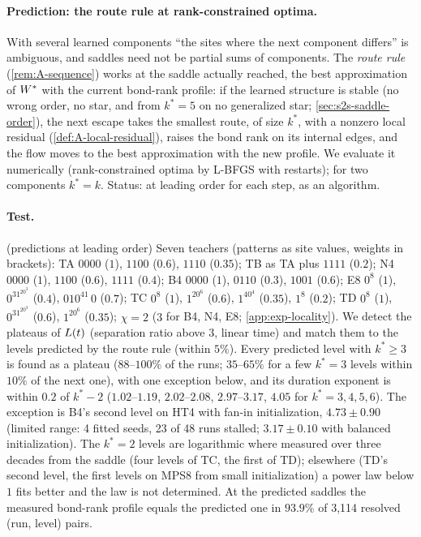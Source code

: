 \paragraph{Prediction: the route rule at rank-constrained optima.}
With several learned components ``the sites where the next component differs'' is ambiguous, and saddles need not
be partial sums of components. The \emph{route rule} (\cref{rem:A-sequence}) works at the saddle actually
reached, the best approximation of $W^{*}$ with the current bond-rank profile: if the learned structure is stable
(no wrong order, no star, and from $k^*=5$ on no generalized star; \cref{sec:s2s-saddle-order}), the next escape
takes the smallest route, of size $k^*$, with a nonzero local residual (\cref{def:A-local-residual}), raises the
bond rank on its internal edges, and the flow moves to the best approximation with the new profile. We evaluate
it numerically (rank-constrained optima by L-BFGS with restarts); for two components $k^*=k$. Status: \derived{}
at leading order for each step, \conjecture{} as an algorithm.

\paragraph{Test.}
\empirical{} (predictions \derived{} at leading order) Seven teachers (patterns as site values, weights in
brackets): TA $0000$ ($1$), $1100$ ($0.6$), $1110$ ($0.35$); TB as TA plus $1111$ ($0.2$); N4 $0000$ ($1$),
$1100$ ($0.6$), $1111$ ($0.4$); B4 $0000$ ($1$), $0110$ ($0.3$), $1001$ ($0.6$); E8 $0^8$ ($1$), $0^31^20^3$
($0.4$), $010^41\,0$ ($0.7$); TC $0^8$ ($1$), $1^20^6$ ($0.6$), $1^40^4$ ($0.35$), $1^8$ ($0.2$); TD $0^8$ ($1$),
$0^31^20^3$ ($0.6$), $1^20^6$ ($0.35$); $\chi=2$ ($3$ for B4, N4, E8; \cref{app:exp-locality}). We detect the
plateaus of $L(t)$ (separation ratio above $3$, linear time) and match them to the levels predicted by the
route rule (within $5\%$). Every predicted level with $k^*\ge3$ is found as a plateau ($88$--$100\%$ of the runs;
$35$--$65\%$ for a few $k^*=3$ levels within $10\%$ of the next one), with one exception below, and its duration
exponent is within $0.2$ of $k^*-2$ ($1.02$--$1.19$, $2.02$--$2.08$, $2.97$--$3.17$, $4.05$ for $k^*=3,4,5,6$).
The exception is B4's second level on HT4 with fan-in initialization, $4.73\pm0.90$ (limited range: 4 fitted
seeds, 23 of 48 runs stalled; $3.17\pm0.10$ with balanced initialization). The $k^*=2$ levels are logarithmic
where measured over three decades from the saddle (four levels of TC, the first of TD); elsewhere (TD's second
level, the first levels on MPS8 from small initialization) a power law below $1$ fits better and the law is not
determined. At the predicted saddles the measured bond-rank profile equals the predicted one in $93.9\%$ of 3,114
resolved (run, level) pairs. \newresult

